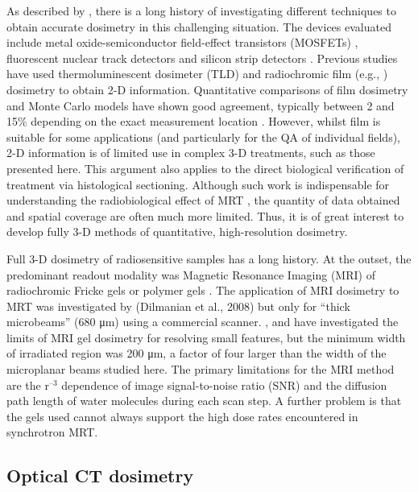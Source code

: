 	As described by \cite{brauer-krischpotential2010}, there is a long history of investigating different techniques to obtain accurate dosimetry in this challenging situation. The devices evaluated include metal oxide-semiconductor field-effect transistors (MOSFETs) \cite{brauer2003mosfet, siegbahnmosfet2009}, fluorescent nuclear track detectors \cite{akselrod2006novel} and silicon strip detectors \cite{lerch2011dosimetry}.
	Previous studies have used thermoluminescent dosimeter (TLD) \cite{ptaszkiewicz2008tld} and radiochromic film (e.g., \cite{crosbie2008method, serduchigh-precision2010}) dosimetry to obtain 2-D information. Quantitative comparisons of film dosimetry and Monte Carlo models have shown good agreement, typically between 2 and 15\% depending on the exact measurement location \cite{martinez-roviradevelopment2012}.  However, whilst film is suitable for some applications (and particularly for the QA of individual fields), 2-D information is of limited use in complex 3-D treatments, such as those presented here. This argument also applies to the direct biological verification of treatment via histological sectioning. Although such work is indispensable for understanding the radiobiological effect of MRT \cite{crosbie2010tumor}, the quantity of data obtained and spatial coverage are often much more limited. Thus, it is of great interest to develop fully 3-D methods of quantitative, high-resolution dosimetry.
	
	Full 3-D dosimetry of radiosensitive samples has a long history. At the outset, the predominant readout modality was Magnetic Resonance Imaging (MRI) of radiochromic Fricke gels \cite{appleby1987imaging, schreiner2004review} or polymer gels \cite{baldock2010polymer,maryanski1993nmr}. The application of MRI dosimetry to MRT was investigated by (Dilmanian et al., 2008) but only for “thick microbeams” (680 \si{\um}) using a commercial scanner. \cite{berghigh2004}, \cite{bayrederthe2008} and \cite{heilemann2015pushing} have investigated the limits of MRI gel dosimetry for resolving small features, but the minimum width of irradiated region was 200 \si{\um}, a factor of four larger than the width of the microplanar beams studied here. The primary limitations for the MRI method are the r$^{–3}$ dependence of image signal-to-noise ratio (SNR) and the diffusion path length of water molecules during each scan step. A further problem is that the gels used cannot always support the high dose rates encountered in synchrotron MRT.
	
	\subsection{Optical CT dosimetry}
	
